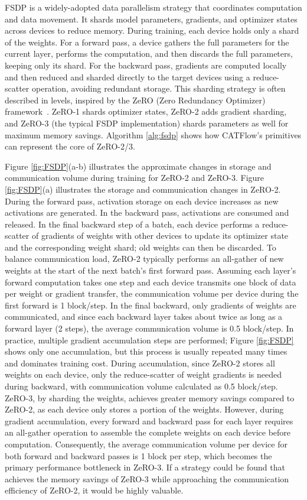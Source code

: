 \documentclass[letterpaper,twocolumn,10pt]{article}
\newcommand{\name}{CATFlow}
\begin{document}
FSDP is a widely-adopted data parallelism strategy that coordinates computation and data movement. It shards model parameters, gradients, and optimizer states across devices to reduce memory. During training, each device holds only a shard of the weights. For a forward pass, a device gathers the full parameters for the current layer, performs the computation, and then discards the full parameters, keeping only its shard. For the backward pass, gradients are computed locally and then reduced and sharded directly to the target devices using a reduce-scatter operation, avoiding redundant storage. This sharding strategy is often described in levels, inspired by the ZeRO (Zero Redundancy Optimizer) framework~\cite{rajbhandari2020zero}. ZeRO-1 shards optimizer states, ZeRO-2 adds gradient sharding, and ZeRO-3 (the typical FSDP implementation) shards parameters as well for maximum memory savings. Algorithm \ref{alg:fsdp} shows how \name{}'s primitives can represent the core of ZeRO-2/3. 

Figure \ref{fig:FSDP}(a-b) illustrates the approximate changes in storage and communication volume during training for ZeRO-2 and ZeRO-3. Figure \ref{fig:FSDP}(a) illustrates the storage and communication changes in ZeRO-2. During the forward pass, activation storage on each device increases as new activations are generated. In the backward pass, activations are consumed and released. In the final backward step of a batch, each device performs a reduce-scatter of gradients of weights with other devices to update its optimizer state and the corresponding weight shard; old weights can then be discarded. To balance communication load, ZeRO-2 typically performs an all-gather of new weights at the start of the next batch's first forward pass. Assuming each layer's forward computation takes one step and each device transmits one block of data per weight or gradient transfer, the communication volume per device during the first forward is 1 block/step. In the final backward, only gradients of weights are communicated, and since each backward layer takes about twice as long as a forward layer (2 steps), the average communication volume is 0.5 block/step. In practice, multiple gradient accumulation steps are performed; Figure \ref{fig:FSDP} shows only one accumulation, but this process is usually repeated many times and dominates training cost. During accumulation, since ZeRO-2 stores all weights on each device, only the reduce-scatter of weight gradients is needed during backward, with communication volume calculated as 0.5 block/step. ZeRO-3, by sharding the weights, achieves greater memory savings compared to ZeRO-2, as each device only stores a portion of the weights. However, during gradient accumulation, every forward and backward pass for each layer requires an all-gather operation to assemble the complete weights on each device before computation. Consequently, the average communication volume per device for both forward and backward passes is 1 block per step, which becomes the primary performance bottleneck in ZeRO-3. If a strategy could be found that achieves the memory savings of ZeRO-3 while approaching the communication efficiency of ZeRO-2, it would be highly valuable.
\end{document}
